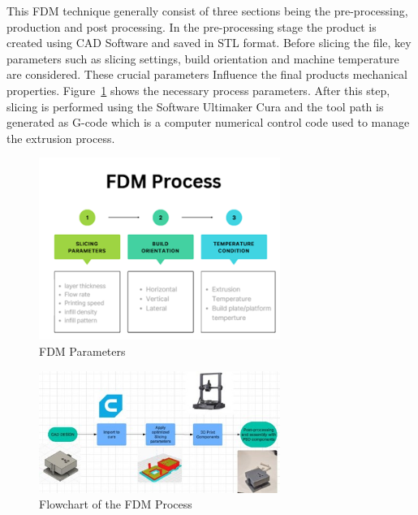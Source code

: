 This FDM technique generally consist of three sections being the pre-processing, production and post processing. 
In the pre-processing stage the product is created using CAD Software and saved in STL format. 
Before slicing the file, key parameters such as slicing settings, build orientation and machine temperature are considered. 
These crucial parameters Influence the final products mechanical properties. Figure~\ref{fig:FDMparameters} shows the necessary process parameters. 
After this step, slicing is performed using the Software Ultimaker Cura and the tool path is generated as G-code which is a computer numerical control code used to manage the extrusion process.

\begin{figure}[htbp]
    \centering
    \includegraphics[width=0.7\textwidth]{figures/CAD-3DPrint/FDMflowchart.png}
    \caption{FDM Parameters }
    \label{fig:FDMparameters}
    
\end{figure}

\begin{figure}[htbp]
    \centering
    \includegraphics[width=0.7\textwidth]{figures/CAD-3DPrint/FullFlowChart.jpg}
    \caption{Flowchart of the FDM Process}
    \label{fig:FDMflowchart}
    
\end{figure}


